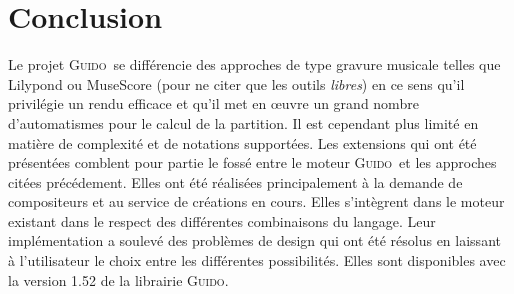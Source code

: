 \documentclass{article}
\newcommand{\guido}			{\textsc{Guido}}
\begin{document}
\section{Conclusion}\label{sec:conclusion}
Le projet \guido\ se différencie des approches de type gravure musicale telles que Lilypond ou MuseScore (pour ne citer que les outils \emph{libres}) en ce sens qu'il privilégie un rendu efficace et qu'il met en \oe{}uvre un grand nombre d'automatismes pour le calcul de la partition. Il est cependant plus limité en matière de complexité et de notations supportées. Les extensions qui ont été présentées comblent pour partie le fossé entre le moteur \guido\ et les approches citées précédement. Elles ont été réalisées principalement à la demande de compositeurs et au service de créations en cours. Elles s'intègrent dans le moteur existant dans le respect des différentes combinaisons du langage. Leur implémentation a soulevé des problèmes de design qui ont été résolus en laissant à l'utilisateur le choix entre les différentes possibilités. Elles sont disponibles avec la version 1.52 de la librairie \guido{}. 



\balance


\end{document}

